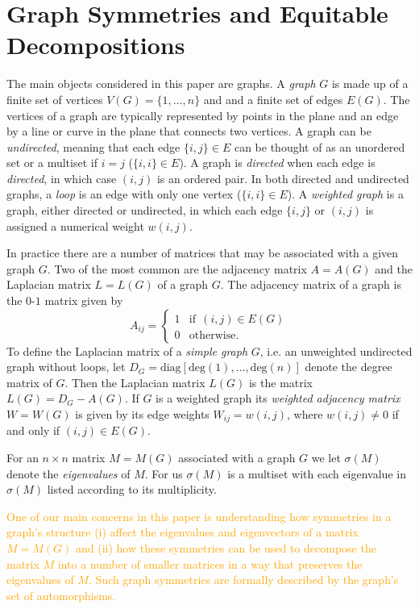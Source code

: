 \documentclass[preprint,12pt]{elsarticle}
\theoremstyle{definition}
\theoremstyle{remark}
\newcommand{\afcomm}[1]{\textcolor{orange}{#1}}
\renewcommand{\emph}{\textit}
\begin{document}
\section{Graph Symmetries and Equitable Decompositions}\label{sec:EP}

The main objects considered in this paper are graphs. A \emph{graph} $G$ is made up of a finite set of vertices $V(G)=\{1,\dots,n\}$ and and a finite set of edges $E(G)$. The vertices of a graph are typically represented by points in the plane and an edge by a line or curve in the plane that connects two vertices. A graph can be \emph{undirected}, meaning that each edge $\{i,j\}\in E$ can be thought of as an unordered set or a multiset if $i=j$ ($\{i,i\}\in E$). A graph is \emph{directed} when each edge is {\emph{directed}, in which case $(i,j)$ is an ordered pair. In both directed and undirected graphs, a} \emph{loop} is an edge with only one vertex ($\{i, i\}\in E$). A \emph{weighted graph} is a graph, either directed or undirected, in which each edge $\{i,j\}$ or $(i,j)$ is assigned a numerical weight $w(i,j)$.

In practice there are a number of matrices that may be associated with a given graph $G$. Two of the most common are the adjacency matrix $A=A(G)$ and the Laplacian matrix $L=L(G)$ of a graph $G$. The adjacency matrix of a graph is the $0$-$1$ matrix given by
\[
A_{ij}=
\begin{cases}
1 &\text{if} \ \ (i,j)\in E(G)\\
0 &\text{otherwise}.
\end{cases}
\]
To define the Laplacian matrix of a \emph{simple graph} $G$, i.e. an unweighted undirected graph without loops, let $D_G=\text{diag}[\text{deg}(1),\dots,\text{deg}(n)]$ denote the degree matrix of $G$. Then the Laplacian matrix $L(G)$ is the matrix $L(G)=D_G-A(G)$. If $G$ is a weighted graph its \textit{weighted adjacency matrix} $W=W(G)$ is given by its edge weights $W_{ij} = w(i,j)$,  where  $w(i,j) \neq 0$ if and only if $(i,j) \in E(G)$.

For an $n\times n$ matrix $M=M(G)$ associated with a graph $G$ we let $\sigma(M)$ denote the \emph{eigenvalues} of $M$. For us $\sigma(M)$ is a multiset with each eigenvalue in $\sigma(M)$ listed according to its multiplicity.

\afcomm{
One of our main concerns in this paper is understanding how symmetries in a graph's structure (i) affect the eigenvalues and eigenvectors of a matrix $M=M(G)$ and (ii) how these symmetries can be used to decompose the matrix $M$ into a number of smaller matrices in a way that preserves the eigenvalues of $M$. Such graph symmetries are formally described by the graph's set of automorphisms.}
\end{document}
